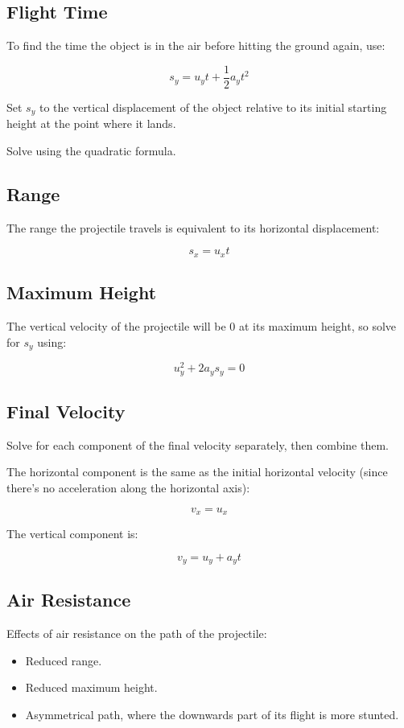 \documentclass[a4paper,11pt]{report}
\begin{document}
\subsection{Flight Time}

To find the time the object is in the air before hitting the ground again, use:

$$
s_y = u_y t + \frac{1}{2} a_y t^2
$$

Set $s_y$ to the vertical displacement of the object relative to its initial
starting height at the point where it lands.

Solve using the quadratic formula.

\subsection{Range}

The range the projectile travels is equivalent to its horizontal displacement:

$$
s_x = u_x t
$$

\subsection{Maximum Height}

The vertical velocity of the projectile will be 0 at its maximum height, so
solve for $s_y$ using:

$$
u_y^2 + 2 a_y s_y = 0
$$

\subsection{Final Velocity}

Solve for each component of the final velocity separately, then combine them.

The horizontal component is the same as the initial horizontal velocity (since
there's no acceleration along the horizontal axis):

$$
v_x = u_x
$$

The vertical component is:

$$
v_y = u_y + a_y t
$$

\subsection{Air Resistance}

Effects of air resistance on the path of the projectile:

\begin{itemize}
\item Reduced range.
\item Reduced maximum height.
\item Asymmetrical path, where the downwards part of its flight is more stunted.
\end{itemize}
\end{document}
